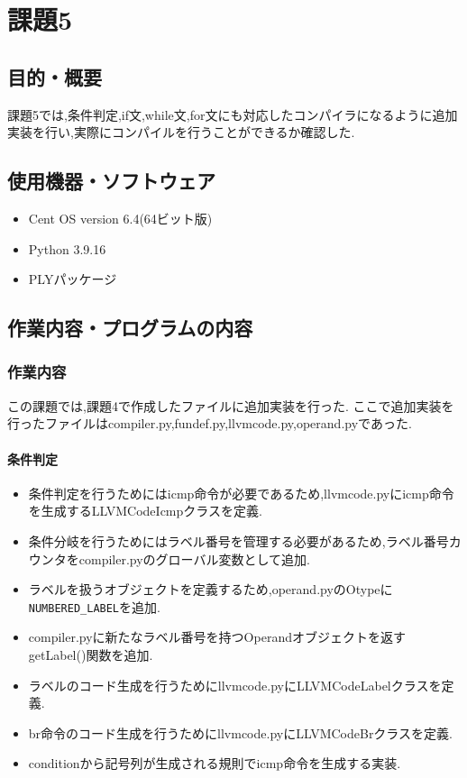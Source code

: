 \documentclass[main]{subfiles}
\begin{document}
\chapter{課題5}
\section{目的・概要}
課題5では,条件判定,if文,while文,for文にも対応したコンパイラになるように追加実装を行い,実際にコンパイルを行うことができるか確認した.

\section{使用機器・ソフトウェア}
\begin{itemize}
    \item Cent OS version 6.4(64ビット版)
    \item Python 3.9.16
    \item PLYパッケージ
\end{itemize}

\section{作業内容・プログラムの内容}
\subsection{作業内容}
この課題では,課題4で作成したファイルに追加実装を行った.
ここで追加実装を行ったファイルはcompiler.py,fundef.py,llvmcode.py,operand.pyであった.

\subsubsection{条件判定}
\begin{oframed}
\begin{itemize}
    \item 条件判定を行うためにはicmp命令が必要であるため,llvmcode.pyにicmp命令を生成するLLVMCodeIcmpクラスを定義.
    \item 条件分岐を行うためにはラベル番号を管理する必要があるため,ラベル番号カウンタをcompiler.pyのグローバル変数として追加.
    \item ラベルを扱うオブジェクトを定義するため,operand.pyのOtypeに\verb|NUMBERED_LABEL|を追加.
    \item compiler.pyに新たなラベル番号を持つOperandオブジェクトを返すgetLabel()関数を追加.
    \item ラベルのコード生成を行うためにllvmcode.pyにLLVMCodeLabelクラスを定義.
    \item br命令のコード生成を行うためにllvmcode.pyにLLVMCodeBrクラスを定義.
    \item conditionから記号列が生成される規則でicmp命令を生成する実装.
\end{itemize}
\end{oframed}
\end{document}
